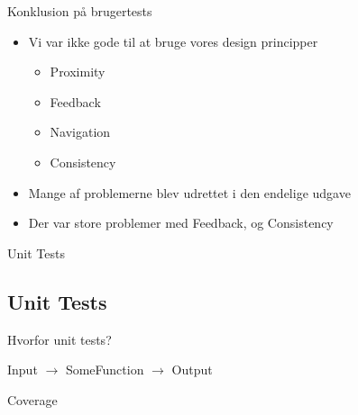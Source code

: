 \begin{frame}{Konklusion på brugertests}	
	
\begin{itemize}
	\item Vi var ikke gode til at bruge vores design principper
		\begin{itemize}
			\item Proximity
			\item Feedback
			\item Navigation
			\item Consistency
		\end{itemize}
	\item Mange af problemerne blev udrettet i den endelige udgave
	\item Der var store problemer med Feedback, og Consistency
\end{itemize}
  
\end{frame}


\begin{frame}{Unit Tests}
\subsection{Unit Tests}

Hvorfor unit tests?

Input $\rightarrow$ SomeFunction $\rightarrow$  Output

Coverage

\end{frame}
